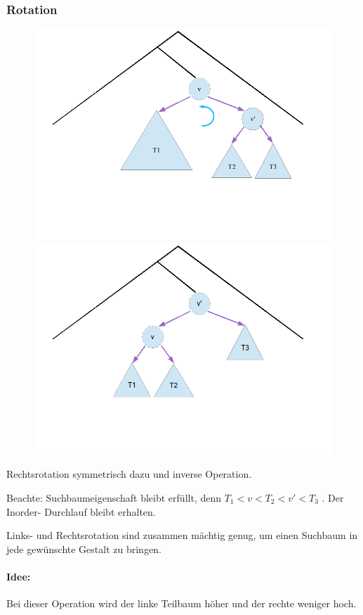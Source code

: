 \documentclass[fleqn]{scrartcl}
\begin{document}
\subsubsection{Rotation}
\begin{figure}[htbp]
\includegraphics[scale=0.35]{./SuchbaumBaumRotieren1} \hfill
\includegraphics[scale=0.35]{./SuchbaumBaumRotieren2}
\end{figure}
Rechtsrotation symmetrisch dazu und inverse Operation.

Beachte: Suchbaumeigenschaft bleibt erfüllt, denn 
\glqq $T_1 < v < T_2 < v' < T_3$ \grqq. Der Inorder- Durchlauf bleibt erhalten.

Links- und Rechtsrotation sind zusammen mächtig genug, um einen Suchbaum in jede gewünschte Gestalt zu bringen.
\paragraph*{Idee:} Bei dieser Operation wird der linke Teilbaum höher und der rechte weniger hoch.
\end{document}
